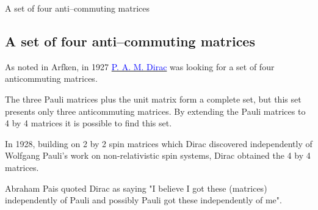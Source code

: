 \documentclass[handout,10pt]{beamer}
\begin{document}
\begin{frame}[fragile]{A set of four anti--commuting matrices}
\subsection{A set of four anti--commuting matrices}
As noted in Arfken, in 1927   \href{https://en.wikipedia.org/wiki/Paul_Dirac}{\textcolor{blue}{P. A. M. Dirac}} was looking for a set of four anticommuting matrices. 

\pause
The three Pauli matrices plus the unit  matrix form a complete set, but this set presents \alert{only three anticommuting matrices}. By extending the Pauli matrices to 4 by 4 matrices it is possible to find this set. 

\pause
In 1928, building on 2 by 2 spin matrices which Dirac discovered independently of Wolfgang Pauli's work on non-relativistic spin systems, Dirac obtained the 4 by 4 matrices. 

\pause
\alert{Abraham Pais quoted Dirac as saying "I believe I got these (matrices) independently of Pauli and possibly Pauli got these independently of me"}.

\end{frame}
\end{document}
